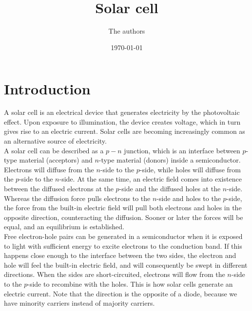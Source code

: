 \documentclass[a4paper]{article}
\title{Solar cell}
\author{The authors}
\date{\today}
\begin{document}
\maketitle

\section{Introduction}

A solar cell is an electrical device that generates electricity by the photovoltaic effect. Upon exposure to illumination, the device creates voltage, which in turn gives rise to an electric current. Solar cells are becoming increasingly common as an alternative source of electricity. \\

A solar cell can be described as a $p-n$ junction, which is an interface between $p$-type material (acceptors) and $n$-type material (donors) inside a semiconductor. Electrons will diffuse from the $n$-side to the $p$-side, while holes will diffuse from the $p$-side to the $n$-side. At the same time, an electric field comes into existence between the diffused electrons at the $p$-side and the diffused holes at the $n$-side. Whereas the diffusion force pulls electrons to the $n$-side and holes to the $p$-side, the force from the built-in electric field will pull both electrons and holes in the opposite direction, counteracting the diffusion. Sooner or later the forces will be equal, and an equilibrium is established. \\


Free electron-hole pairs can be generated in a semiconductor when it is exposed to light with sufficient energy to excite electrons to the conduction band. If this happens close enough to the interface between the two sides, the electron and hole will feel the built-in electric field, and will consequently be swept in different directions. When the sides are short-circuited, electrons will flow from the $n$-side to the $p$-side to recombine with the holes. This is how solar cells generate an electric current. Note that the direction is the opposite of a diode, because we have minority carriers instead of majority carriers.
\end{document}
